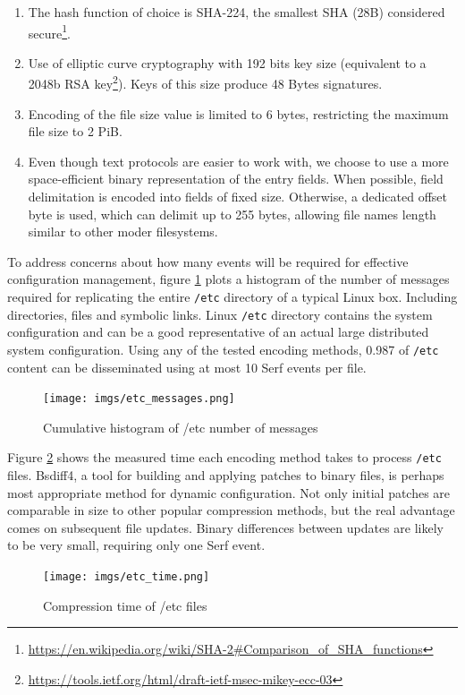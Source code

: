 \documentclass{sig-alternate}
\begin{document}
\begin{enumerate}
\item The hash function of choice is SHA-224, the smallest SHA (28B) considered secure\footnote{\url{https://en.wikipedia.org/wiki/SHA-2\#Comparison\_of\_SHA\_functions}}.
\item Use of elliptic curve cryptography with 192 bits key size (equivalent to a 2048b RSA key\footnote{\url{https://tools.ietf.org/html/draft-ietf-msec-mikey-ecc-03}}). Keys of this size produce  48 Bytes signatures.
\item Encoding of the file size value is limited to 6 bytes, restricting the maximum file size to 2 PiB.
\item Even though text protocols are easier to work with, we choose to use a more space-efficient binary representation of the entry fields. When possible, field delimitation is encoded into fields of fixed size. Otherwise, a dedicated offset byte is used, which can delimit up to 255 bytes, allowing file names length similar to other moder filesystems.
\end{enumerate}

To address concerns about how many events will be required for effective configuration management, figure \ref{fig:etc-messages} plots a histogram of the number of messages required for replicating the entire \texttt{/etc} directory of a typical Linux box. Including directories, files and symbolic links. Linux \texttt{/etc} directory contains the system configuration and can be a good representative of an actual large distributed system configuration. Using any of the tested encoding methods, 0.987 of \texttt{/etc} content can be disseminated using at most 10 Serf events per file.

\begin{figure}
\centering
\texttt{[image: imgs/etc\_messages.png]}
\caption{Cumulative histogram of /etc number of messages}
\label{fig:etc-messages}
\end{figure}

Figure \ref{fig:etc-time} shows the measured time each encoding method takes to process \texttt{/etc} files. Bsdiff4, a tool for building and applying patches to binary files, is perhaps most appropriate method for dynamic configuration. Not only initial patches are comparable in size to other popular compression methods, but the real advantage comes on subsequent file updates. Binary differences between updates are likely to be very small, requiring only one Serf event.

\begin{figure}
\centering
\texttt{[image: imgs/etc\_time.png]}
\caption{Compression time of /etc files}
\label{fig:etc-time}
\end{figure}
\end{document}
